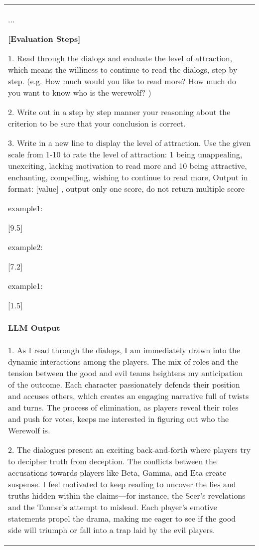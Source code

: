 \begin{table*}[ht]
{\begin{tabular}{p{16cm}}
{    ...

    \textbf{[Evaluation Steps]}

    1. Read through the dialogs and evaluate the level of attraction, which means the williness to continue to read the dialogs, step by step.
    (e.g. How much would you like to read more? 
    How much do you want to know who is the werewolf? )
    
    2. Write out in a step by step manner your reasoning about the criterion to be sure that your conclusion is correct.
    
    3. Write in a new line to display the level of attraction. Use the given scale from 1-10 to rate the level of attraction: 1 being unappealing, unexciting, lacking motivation to read more and 10 being attractive, enchanting, compelling, wishing to continue to read more, 
    Output in format: [value] , output only one score, do not return multiple score 

    example1:

    [9.5]

    example2:

    [7.2]

    example1:

    [1.5]

    }
    \\ 

    \rowcolor[gray]{0.95} \vspace*{-8pt} {\fontsize{10pt}{12pt}\selectfont \bf LLM Output } \vspace*{2pt} \\

    {\ttfamily\small
    1. As I read through the dialogs, I am immediately drawn into the dynamic interactions among the players. The mix of roles and the tension between the good and evil teams heightens my anticipation of the outcome. Each character passionately defends their position and accuses others, which creates an engaging narrative full of twists and turns. The process of elimination, as players reveal their roles and push for votes, keeps me interested in figuring out who the Werewolf is.

    2. The dialogues present an exciting back-and-forth where players try to decipher truth from deception. The conflicts between the accusations towards players like Beta, Gamma, and Eta create suspense. I feel motivated to keep reading to uncover the lies and truths hidden within the claims—for instance, the Seer's revelations and the Tanner's attempt to mislead. Each player's emotive statements propel the drama, making me eager to see if the good side will triumph or fall into a trap laid by the evil players.
    
}
\end{tabular}}
\end{table*}
